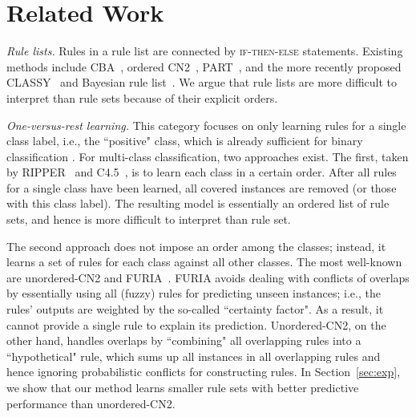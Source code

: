 \section{Related Work} \label{sec:related}

\noindent
\emph{Rule lists.}
Rules in a rule list are connected by \textsc{if-then-else} statements. Existing methods include CBA~\citep{liu1998CBA}, ordered CN2~\citep{clark1989cn2}, PART~\citep{frank1998generating}, and the more recently proposed CLASSY~\citep{proencca2020interpretable} and Bayesian rule list~\citep{yang2017scalable-bayesian-rule-list}. We argue that rule lists are more difficult to interpret than rule sets because of their explicit orders. 

\smallskip \noindent
\emph{One-versus-rest learning.}
This category focuses on only learning rules for a single class label, i.e., the ``positive" class, which is already sufficient for binary classification \citep{wang2017bayesian,dash2018boolean,yang2021learning}. For multi-class classification, two approaches exist. The first, taken by RIPPER~\citep{cohen1995ripper} and C4.5~\citep{quinlan2014c4}, is to learn each class in a certain order. After all rules for a single class have been learned, all covered instances are removed (or those with this class label). The resulting model is essentially an ordered list of rule sets, and hence is more difficult to interpret than rule set.

The second approach does not impose an order among the classes; instead, it learns a set of rules for each class against all other classes. The most well-known are unordered-CN2 and FURIA~\citep{clark1991cn2Improve,huhn2009furia}. 
FURIA avoids dealing with conflicts of overlaps by essentially using all (fuzzy) rules for predicting unseen instances; i.e., the rules' outputs are weighted by the so-called ``certainty factor". As a result, it cannot provide a single rule to explain its prediction. Unordered-CN2, on the other hand, handles overlaps by ``combining" all overlapping rules into a ``hypothetical" rule, which sums up all instances in all overlapping rules and hence ignoring probabilistic conflicts for constructing rules. In Section~\ref{sec:exp}, we show that our method learns smaller rule sets with better predictive performance than unordered-CN2.

